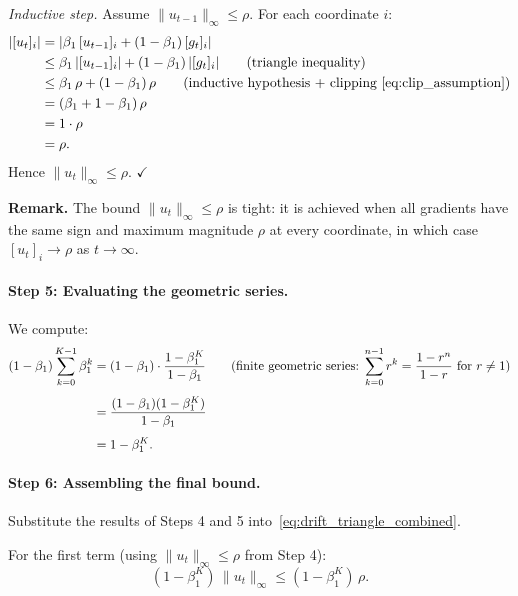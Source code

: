 \documentclass{article}
\begin{document}
\emph{Inductive step.}
Assume $\|u_{t-1}\|_\infty \leq \rho$. For each coordinate $i$:
\begin{align}
|[u_t]_i|
&= |\beta_1\,[u_{t-1}]_i + (1-\beta_1)\,[g_t]_i|
\notag \\
&\leq \beta_1\,|[u_{t-1}]_i| + (1-\beta_1)\,|[g_t]_i|
\qquad\text{(triangle inequality)}
\notag \\
&\leq \beta_1\,\rho + (1-\beta_1)\,\rho
\qquad\text{(inductive hypothesis $+$ clipping~\eqref{eq:clip_assumption})}
\notag \\
&= (\beta_1 + 1 - \beta_1)\,\rho
\notag \\
&= 1 \cdot \rho
\notag \\
&= \rho.
\label{eq:drift_u_induction}
\end{align}
Hence $\|u_t\|_\infty \leq \rho$. $\checkmark$

\noindent\textbf{Remark.} The bound $\|u_t\|_\infty \leq \rho$ is tight:
it is achieved when all gradients have the same sign and maximum magnitude
$\rho$ at every coordinate, in which case $[u_t]_i \to \rho$ as $t \to \infty$.

\paragraph{Step 5: Evaluating the geometric series.}

We compute:
\begin{align}
(1-\beta_1)\sum_{k=0}^{K-1}\beta_1^k
&= (1-\beta_1)\cdot\frac{1 - \beta_1^K}{1 - \beta_1}
\qquad\text{(finite geometric series: $\sum_{k=0}^{n-1}r^k = \frac{1-r^n}{1-r}$ for $r \neq 1$)}
\notag \\[4pt]
&= \frac{(1-\beta_1)(1-\beta_1^K)}{1-\beta_1}
\notag \\[4pt]
&= 1 - \beta_1^K.
\label{eq:drift_geom_series}
\end{align}

\paragraph{Step 6: Assembling the final bound.}

Substitute the results of Steps 4 and 5
into~\eqref{eq:drift_triangle_combined}.

For the first term (using $\|u_t\|_\infty \leq \rho$ from Step 4):
\begin{equation}
(1-\beta_1^K)\,\|u_t\|_\infty
\leq (1-\beta_1^K)\,\rho.
\label{eq:drift_term1_final}
\end{equation}
\end{document}

